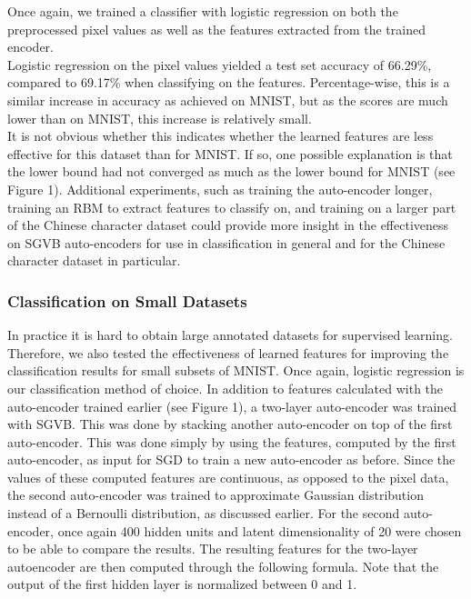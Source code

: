 \documentclass{article}
\begin{document}
Once again, we trained a classifier with logistic regression on both the preprocessed pixel values as well as the features extracted from the trained encoder. \\
Logistic regression on the pixel values yielded a test set accuracy of 66.29\%, compared to 69.17\% when classifying on the features. Percentage-wise, this is a similar increase in accuracy as achieved on MNIST, but as the scores are much lower than on MNIST, this increase is relatively small. \\
It is not obvious whether this indicates whether the learned features are less effective for this dataset than for MNIST. If so, one possible explanation is that the lower bound had not converged as much as the lower bound for MNIST (see Figure 1). Additional experiments, such as training the auto-encoder longer, training an RBM to extract features to classify on, and training on a larger part of the Chinese character dataset could provide more insight in the effectiveness on SGVB auto-encoders for use in classification in general and for the Chinese character dataset in particular.


\subsubsection{Classification on Small Datasets}

In practice it is hard to obtain large annotated datasets for supervised learning. Therefore, we also tested the effectiveness of learned features for improving the classification results for small subsets of MNIST. Once again, logistic regression is our classification method of choice. In addition to features calculated with the auto-encoder trained earlier (see Figure 1), a two-layer auto-encoder was trained with SGVB. This was done by stacking another auto-encoder on top of the first auto-encoder. This was done simply by using the features, computed by the first auto-encoder, as input for SGD to train a new auto-encoder as before. Since the values of these computed features are continuous, as opposed to the pixel data, the second auto-encoder was trained to approximate Gaussian distribution instead of a Bernoulli distribution, as discussed earlier. For the second auto-encoder, once again 400 hidden units and latent dimensionality of 20 were chosen to be able to compare the results. The resulting features for the two-layer autoencoder are then computed through the following formula. Note that the output of the first hidden layer is normalized between 0 and 1.
\end{document}
